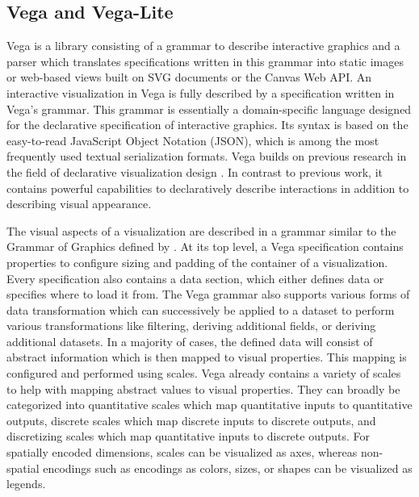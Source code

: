 \subsection{Vega and Vega-Lite}

Vega \parencite{Vega} is a library consisting of a grammar to describe
interactive graphics and a parser which translates specifications
written in this grammar into static images or web-based views built on
SVG documents or the Canvas Web API. An interactive visualization in
Vega is fully described by a specification written in Vega's grammar.
This grammar is essentially a domain-specific language designed for
the declarative specification of interactive graphics. Its syntax is
based on the easy-to-read JavaScript Object Notation (JSON), which is
among the most frequently used textual serialization formats. Vega
builds on previous research in the field of declarative visualization
design \parencite{GrammarOfGraphics}. In contrast to previous work, it
contains powerful capabilities to declaratively describe interactions
\parencite{ReactiveVega} in addition to describing visual appearance.

The visual aspects of a visualization are described in a grammar
similar to the Grammar of Graphics defined by
\textcite{GrammarOfGraphics}. At its top level, a Vega specification
contains properties to configure sizing and padding of the container
of a visualization. Every specification also contains a data section,
which either defines data or specifies where to load it from.  The
Vega grammar also supports various forms of data transformation which
can successively be applied to a dataset to perform various
transformations like filtering, deriving additional fields, or
deriving additional datasets. In a majority of cases, the defined data
will consist of abstract information which is then mapped to visual
properties. This mapping is configured and performed using scales.
Vega already contains a variety of scales to help with mapping
abstract values to visual properties. They can broadly be categorized
into quantitative scales which map quantitative inputs to quantitative
outputs, discrete scales which map discrete inputs to discrete
outputs, and discretizing scales which map quantitative inputs to
discrete outputs. For spatially encoded dimensions, scales can
be visualized as axes, whereas non-spatial encodings such as encodings
as colors, sizes, or shapes can be visualized as legends.

